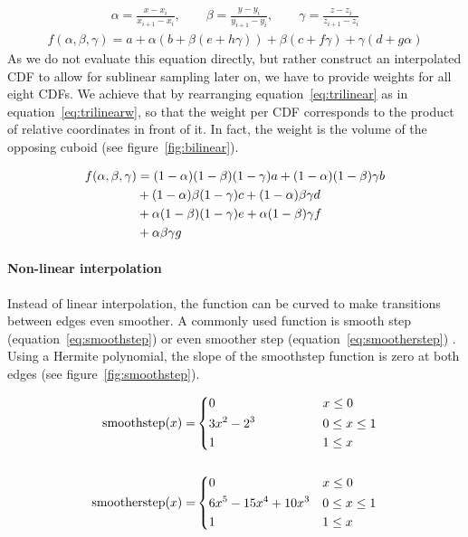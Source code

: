 \begin{align}
    \alpha = \frac{x-x_i}{x_{i+1}-x_i}, \qquad \beta = \frac{y-y_i}{y_{i+1}-y_i}, \qquad \gamma = \frac{z-z_i}{z_{i+1}-z_i}
\end{align}
\begin{align}\label{eq:trilinear}
    f(\alpha, \beta, \gamma) = a + \alpha\left(b + \beta(e + h\gamma)\right) + \beta(c + f\gamma) + \gamma(d + g\alpha)
\end{align}
As we do not evaluate this equation directly, but rather construct an interpolated CDF to allow for sublinear sampling later on, we have to provide weights for all eight CDFs. We achieve that by rearranging equation~\ref{eq:trilinear} as in equation~\ref{eq:trilinearw}, so that the weight per CDF corresponds to the product of relative coordinates in front of it. In fact, the weight is the volume of the opposing cuboid (see figure~\ref{fig:bilinear}).


\begin{align}\label{eq:trilinearw}
    f(\alpha, \beta, \gamma) &= (1-\alpha)(1-\beta)(1-\gamma)a + (1-\alpha)(1-\beta)\gamma b  \notag \\
    &+ (1-\alpha)\beta(1-\gamma)c  + (1-\alpha)\beta\gamma d \\
    &+ \alpha(1-\beta)(1-\gamma)e + \alpha(1-\beta)\gamma f \notag \\
    &+ \alpha\beta\gamma g  \notag
\end{align}

\paragraph{Non-linear interpolation}
Instead of linear interpolation, the function can be curved to make transitions between edges even smoother. A commonly used function is smooth step (equation~\ref{eq:smoothstep}) or even smoother step (equation~\ref{eq:smootherstep}) \parencite{ebert2003texturing}. Using a Hermite polynomial, the slope of the smoothstep function is zero at both edges (see figure~\ref{fig:smoothstep}).

\begin{align}
    \text{smoothstep}(x) =& 
    \begin{dcases}
        0& x \leq 0\\
        3x^2 - 2^3 \qquad \qquad ~& 0 \leq x \leq 1 \\
        1& 1 \leq x
    \end{dcases} \label{eq:smoothstep} \\ \notag
    \\ 
    \text{smootherstep}(x) =&
    \begin{dcases}
        0& x \leq 0\\
        6x^5 - 15x^4 + 10x^3& 0 \leq x \leq 1 \\
        1& 1 \leq x
    \end{dcases}
    \label{eq:smootherstep}
\end{align}

